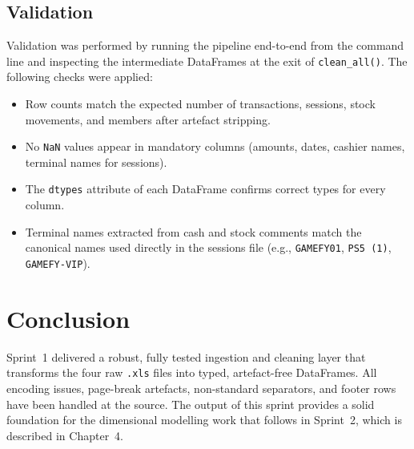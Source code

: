 \subsection{Validation}

Validation was performed by running the pipeline end-to-end from the command line
and inspecting the intermediate DataFrames at the exit of \texttt{clean\_all()}.
The following checks were applied:

\begin{itemize}[noitemsep]
  \item Row counts match the expected number of transactions, sessions, stock
        movements, and members after artefact stripping.
  \item No \texttt{NaN} values appear in mandatory columns (amounts, dates,
        cashier names, terminal names for sessions).
  \item The \texttt{dtypes} attribute of each DataFrame confirms correct types
        for every column.
  \item Terminal names extracted from cash and stock comments match the canonical
        names used directly in the sessions file (e.g., \texttt{GAMEFY01},
        \texttt{PS5\,(1)}, \texttt{GAMEFY-VIP}).
\end{itemize}

\section{Conclusion}

Sprint~1 delivered a robust, fully tested ingestion and cleaning layer that
transforms the four raw \texttt{.xls} files into typed, artefact-free DataFrames.
All encoding issues, page-break artefacts, non-standard separators, and footer
rows have been handled at the source. The output of this sprint provides a solid
foundation for the dimensional modelling work that follows in Sprint~2, which is
described in Chapter~4.
